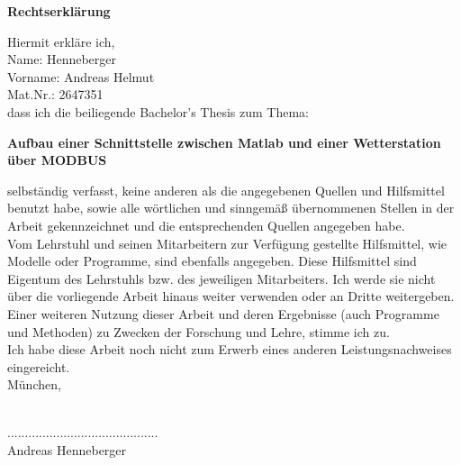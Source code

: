\begin{Huge}
\noindent \textbf{Rechtserklärung}\vspace{1cm}\\
\end{Huge}
\noindent Hiermit erkläre ich,\\
Name: Henneberger\\
Vorname: Andreas Helmut\\
Mat.Nr.: 2647351\vspace{0.4cm}\\
dass ich die beiliegende Bachelor's Thesis zum Thema:\vspace{0.5cm}\\
\begin{center}
\textbf{Aufbau einer Schnittstelle zwischen Matlab und einer Wetterstation über MODBUS}
\end{center}\vspace{0.4cm}
selbständig verfasst, keine anderen als die angegebenen Quellen und Hilfsmittel benutzt habe,
sowie alle wörtlichen und sinngemäß übernommenen Stellen in der Arbeit gekennzeichnet und die 
entsprechenden Quellen angegeben habe.\\
Vom Lehrstuhl und seinen Mitarbeitern zur Verfügung gestellte Hilfsmittel, wie Modelle oder
Programme, sind ebenfalls angegeben. Diese Hilfsmittel sind Eigentum des Lehrstuhls bzw. des
jeweiligen Mitarbeiters. Ich werde sie nicht über die vorliegende Arbeit hinaus weiter verwenden
oder an Dritte weitergeben.\vspace{0.5cm}\\

\noindent Einer weiteren Nutzung dieser Arbeit und deren Ergebnisse (auch Programme und Methoden) zu Zwecken
der Forschung und Lehre, stimme ich zu.\vspace{0.5cm}\\

\noindent Ich habe diese Arbeit noch nicht zum Erwerb eines anderen Leistungsnachweises eingereicht.\vspace{0.5cm}\\

\noindent München, \date{\today}\vspace{0.5cm}\\
\noindent ...........................................\\
Andreas Henneberger
